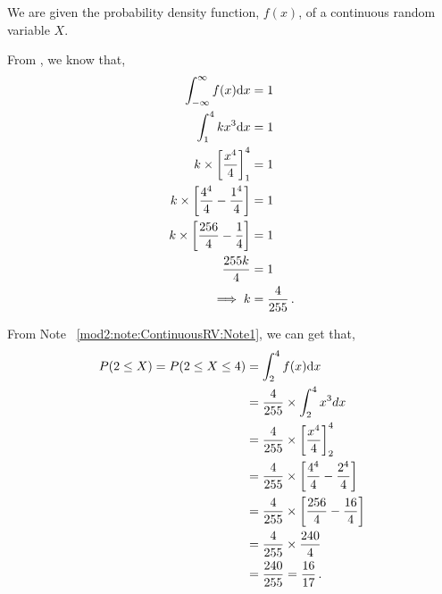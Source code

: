 %
%


\begin{subquestions}
	
\subquestion

We are given the probability density function, $f(x)$, of a continuous random variable $X$.

From , we know that,
\begin{align}
	\int_{-\infty}^{\infty} f(x)\mathrm{d}x & = 1 \nonumber \\
	\int_{1}^{4} kx^3\mathrm{d}x & = 1 \nonumber \\
	k \times \left[\frac{x^4}{4}\right]^4_1 & = 1 \nonumber \\
	k \times \left[\frac{4^4}{4} - \frac{1^4}{4} \right] & = 1 \nonumber \\
	k \times \left[\frac{256}{4} - \frac{1}{4} \right] & = 1 \nonumber \\
	\frac{255k}{4} & = 1 \nonumber \\
	\implies k & = \frac{4}{255} \,.
\end{align}


\subquestion

\begin{subsubquestions}
	
\subsubquestion

From Note ~\ref{mod2:note:ContinuousRV:Note1}, we can get that,
\begin{align}
	P(2 \leq X) = P(2 \leq X \leq 4) & = \int_2^4 f(x)\mathrm{d}x \nonumber \\
	                                 & = \frac{4}{255} \times \int_2^4 x^3{d}x \nonumber \\
	                                 & = \frac{4}{255} \times \left[\frac{x^4}{4}\right]^4_2 \nonumber \\
	                                 & = \frac{4}{255} \times \left[\frac{4^4}{4}-\frac{2^4}{4}\right] \nonumber \\
	                                 & = \frac{4}{255} \times \left[\frac{256}{4}-\frac{16}{4}\right] \nonumber \\
	                                 & = \frac{4}{255} \times \frac{240}{4} \nonumber \\
	                                 & = \frac{240}{255} = \frac{16}{17} \,.
\end{align}
	

\end{subsubquestions}
\end{subquestions}
